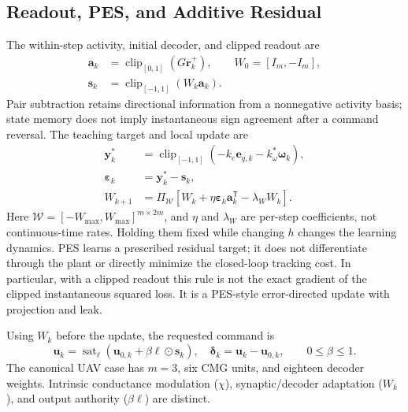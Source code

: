 \documentclass[letterpaper,10pt,conference]{IEEEtran}
\newcommand{\T}{^{\mathsf T}}
\newcommand{\sat}{\operatorname{sat}}
\newcommand{\clip}{\operatorname{clip}}
\begin{document}
\subsection{Readout, PES, and Additive Residual}
The within-step activity, initial decoder, and clipped readout are
\begin{equation}
 \begin{aligned}
 \bm a_k&=\clip_{[0,1]}(G\bm r_k^+),\qquad W_0=[I_m,-I_m],\\
 \bm s_k&=\clip_{[-1,1]}(W_k\bm a_k).
 \end{aligned}
 \label{eq:readout}
\end{equation}
Pair subtraction retains directional information from a nonnegative
activity basis; state memory does not imply instantaneous sign agreement
after a command reversal. The teaching target and local update are
\begin{align}
 \bm y_k^*&=\clip_{[-1,1]}(-k_e\bm e_{q,k}-k_\omega^*\bm\omega_k),\\
 \bm\varepsilon_k&=\bm y_k^*-\bm s_k,\\
 W_{k+1}&=\Pi_{\mathcal W}
       [W_k+\eta\bm\varepsilon_k\bm a_k\T-\lambda_W W_k].
 \label{eq:pes}
\end{align}
Here $\mathcal W=[-W_{\max},W_{\max}]^{m\times2m}$, and
$\eta$ and $\lambda_W$ are per-step coefficients, not continuous-time
rates. Holding them fixed while changing $h$ changes the learning dynamics.
PES learns a prescribed residual target; it does not differentiate through
the plant or directly minimize the closed-loop tracking cost. In particular,
with a clipped readout this rule is not the exact gradient of the clipped
instantaneous squared loss. It is a PES-style error-directed update with
projection and leak.

Using $W_k$ before the update, the requested command is
\begin{equation}
 \bm u_k=\sat_{\bm\ell}(\bm u_{0,k}+\beta\bm\ell\odot\bm s_k),\quad
 \bm\delta_k=\bm u_k-\bm u_{0,k},\qquad 0\le\beta\le1.
 \label{eq:residual}
\end{equation}
The canonical UAV case has $m=3$, six CMG units, and eighteen decoder
weights. Intrinsic conductance modulation ($\chi$), synaptic/decoder
adaptation ($W_k$), and output authority ($\beta\bm\ell$) are distinct.
\end{document}
